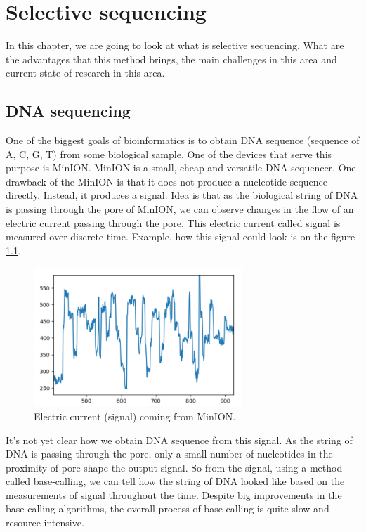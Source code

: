 \chapter{Selective sequencing}

\label{kap:selSeq} %

In this chapter, we are going to look at what is selective sequencing. What are the
advantages that this method brings, the main challenges in this area and current state
of research in this area.

\section{DNA sequencing}

One of the biggest goals of bioinformatics is to obtain DNA sequence (sequence of A, C, G, T)
from some biological sample. One of the devices that serve this purpose is MinION\cite{lu2016oxford}.
MinION is a small, cheap and versatile DNA sequencer. One drawback of the MinION is
that it does not produce a nucleotide sequence directly. Instead, it produces a signal.
Idea is that as the biological string of DNA is passing through the pore of MinION,
we can observe changes in the flow of an electric current passing through the pore.
This electric current called signal is measured over discrete time. Example, how
this signal could look is on the figure \ref{obr:minIonCurrent}.

\begin{figure}
\centerline{\includegraphics[width=0.7\textwidth, height=0.3\textheight]{images/signal}}
\caption[MinION signal]{Electric current (signal) coming from MinION.}
\label{obr:minIonCurrent}
\end{figure}

It's not yet clear how we obtain DNA sequence from this signal. As the string of DNA
is passing through the pore, only a small number of nucleotides in the proximity of pore
shape the output signal. So from the signal, using a method called base-calling, we
can tell how the string of DNA looked like based on the measurements of signal
throughout the time. Despite big improvements in the base-calling algorithms, the overall
process of base-calling is quite slow and resource-intensive.

